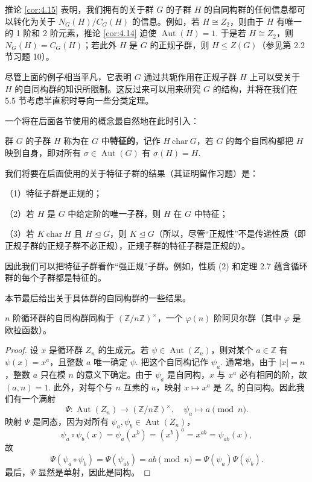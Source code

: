 推论 \ref{cor:4.15} 表明，我们拥有的关于群 \(G\) 的子群 \(H\) 的自同构群的任何信息都可以转化为关于 \(N_G(H)/C_G(H)\) 的信息。例如，若 \(H \cong Z_2\)，则由于 \(H\) 有唯一的 1 阶和 2 阶元素，推论 \ref{cor:4.14} 迫使 \(\operatorname{Aut}(H) = 1\). 于是若 \(H \cong Z_2\)，则 \(N_G(H) = C_G(H)\)；若此外 \(H\) 是 \(G\) 的正规子群，则 \(H \leq Z(G)\)（参见第 2.2 节习题 10）。

尽管上面的例子相当平凡，它表明 \(G\) 通过共轭作用在正规子群 \(H\) 上可以受关于 \(H\) 的自同构群的知识所限制。这反过来可以用来研究 \(G\) 的结构，并将在我们在 5.5 节考虑半直积时导向一些分类定理。

一个将在后面各节使用的概念最自然地在此时引入：

\begin{definition}
群 \(G\) 的子群 \(H\) 称为在 \(G\) 中\textbf{特征的}，记作 \(H\ \mathrm{char}\ G\)，若 \(G\) 的每个自同构都把 \(H\) 映到自身，即对所有 \(\sigma \in \operatorname{Aut}(G)\) 有 \(\sigma(H) = H\).
\end{definition}

我们将要在后面使用的关于特征子群的结果（其证明留作习题）是：

（1）特征子群是正规的；

（2）若 \(H\) 是 \(G\) 中给定阶的唯一子群，则 \(H\) 在 \(G\) 中特征；

（3）若 \(K\ \mathrm{char}\ H\) 且 \(H \trianglelefteq G\)，则 \(K \trianglelefteq G\)（所以，尽管“正规性”不是传递性质（即正规子群的正规子群不必正规），正规子群的特征子群是正规的）。

因此我们可以把特征子群看作“强正规”子群。例如，性质 (2) 和定理 2.7 蕴含循环群的每个子群都是特征的。

本节最后给出关于具体群的自同构群的一些结果。

\begin{proposition}\label{pro:4.16}
\(n\) 阶循环群的自同构群同构于 \((\mathbb{Z}/n\mathbb{Z})^\times\)，一个 \(\varphi(n)\) 阶阿贝尔群（其中 \(\varphi\) 是欧拉函数）。
\end{proposition}

\begin{proof}
设 \(x\) 是循环群 \(Z_n\) 的生成元。若 \(\psi \in \operatorname{Aut}(Z_n)\)，则对某个 \(a \in \mathbb{Z}\) 有 \(\psi(x) = x^a\)，且整数 \(a\) 唯一确定 \(\psi\). 把这个自同构记作 \(\psi_a\). 通常地，由于 \(|x| = n\)，整数 \(a\) 只在模 \(n\) 的意义下确定。由于 \(\psi_a\) 是自同构，\(x\) 与 \(x^a\) 必有相同的阶，故 \((a, n) = 1\). 此外，对每个与 \(n\) 互素的 \(a\)，映射 \(x \mapsto x^a\) 是 \(Z_n\) 的自同构。因此我们有一个满射
\[
\Psi : \operatorname{Aut}(Z_n) \to (\mathbb{Z}/n\mathbb{Z})^\times, \quad \psi_a \mapsto a \pmod{n}.
\]
映射 \(\Psi\) 是同态，因为对所有 \(\psi_a, \psi_b \in \operatorname{Aut}(Z_n)\)，
\[
\psi_a \circ \psi_b(x) = \psi_a(x^b) = (x^b)^a = x^{ab} = \psi_{ab}(x),
\]
故
\[
\Psi(\psi_a \circ \psi_b) = \Psi(\psi_{ab}) = ab \pmod{n} = \Psi(\psi_a)\Psi(\psi_b).
\]
最后，\(\Psi\) 显然是单射，因此是同构。
\end{proof}

